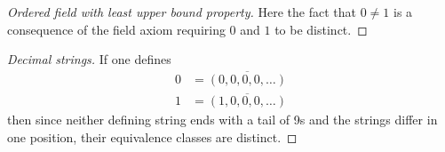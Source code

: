 \documentclass[12pt]{article}
\begin{document}
\begin{proof}[Ordered field with least upper bound property]
Here the fact that $0\ne 1$ is a consequence of the field axiom requiring $0$ and $1$ to be distinct.
\end{proof}

\begin{proof}[Decimal strings]
If one defines
\begin{align*}
0 &= \overline{(0, 0, 0, 0, \dots)} \\
1 &= \overline{(1, 0, 0, 0, \dots)}
\end{align*}
then since neither defining string ends with a tail of 9s and the strings differ in one position, their equivalence classes are distinct.
\end{proof}
\end{document}
